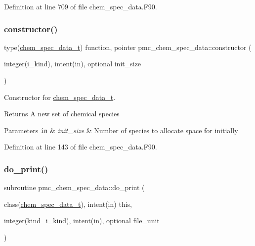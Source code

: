 Definition at line 709 of file chem\+\_\+spec\+\_\+data.\+F90.

\mbox{\label{namespacepmc__chem__spec__data_a2f8149f3510f9754aa917e7bce1467cb}} 
\subsubsection{\texorpdfstring{constructor()}{constructor()}}
{\footnotesize\ttfamily type(\mbox{\hyperlink{structpmc__chem__spec__data_1_1chem__spec__data__t}{chem\+\_\+spec\+\_\+data\+\_\+t}}) function, pointer pmc\+\_\+chem\+\_\+spec\+\_\+data\+::constructor (\begin{DoxyParamCaption}\item[{integer(i\+\_\+kind), intent(in), optional}]{init\+\_\+size }\end{DoxyParamCaption})\hspace{0.3cm}{\ttfamily [private]}}



Constructor for \mbox{\hyperlink{structpmc__chem__spec__data_1_1chem__spec__data__t}{chem\+\_\+spec\+\_\+data\+\_\+t}}. 

\begin{DoxyReturn}{Returns}
A new set of chemical species
\end{DoxyReturn}

\begin{DoxyParams}[1]{Parameters}
\mbox{\tt in}  & {\em init\+\_\+size} & Number of species to allocate space for initially \\
\hline
\end{DoxyParams}


Definition at line 143 of file chem\+\_\+spec\+\_\+data.\+F90.

\mbox{\label{namespacepmc__chem__spec__data_a241ef4f3c9e0a1968b339df331ca8d64}} 
\subsubsection{\texorpdfstring{do\+\_\+print()}{do\_print()}}
{\footnotesize\ttfamily subroutine pmc\+\_\+chem\+\_\+spec\+\_\+data\+::do\+\_\+print (\begin{DoxyParamCaption}\item[{class(\mbox{\hyperlink{structpmc__chem__spec__data_1_1chem__spec__data__t}{chem\+\_\+spec\+\_\+data\+\_\+t}}), intent(in)}]{this,  }\item[{integer(kind=i\+\_\+kind), intent(in), optional}]{file\+\_\+unit }\end{DoxyParamCaption})\hspace{0.3cm}{\ttfamily [private]}}



